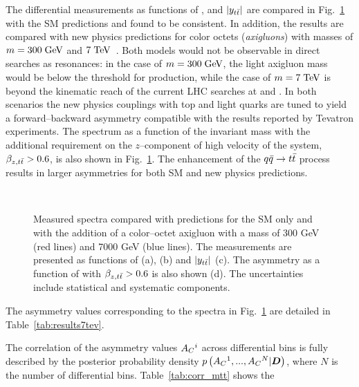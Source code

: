 The differential \ac{} measurements as functions of
\mtt{}, \pttt{} and $|y_{t\bar{t}}{}|$ are compared in Fig.~\ref{fig:unfac_diff}
with the SM predictions and found to be consistent. 
In addition, the results are compared with new physics predictions for
color octets ({\it axigluons}) with masses of $m=300 \; \mathrm{GeV}{}$ and $7
\; \mathrm{TeV}{}$~\cite{AguilarSaavedra:2011ci}. Both models would not
be observable in direct searches as \ttbar{} resonances: in the case
of $m=300\; \mathrm{GeV}$, the light axigluon mass would be below the threshold
for \ttbar{} production, while the case of $m=7 \; \mathrm{TeV}$ is beyond the
kinematic reach of the current LHC searches at \seventev{} and
\eighttev{}. In both scenarios the new physics couplings with top and
light quarks are tuned to yield a forward--backward asymmetry
compatible with the results reported by Tevatron experiments.
The \ac{} spectrum as a function of the \ttbar{} invariant mass \mtt{}
with the additional requirement on the $z$--component of high velocity
of the \ttbar{} system, $\beta_{z,t\bar{t}}{}>0.6$, is also shown in
Fig.~\ref{fig:unfac_diff}. The enhancement of the $q\bar{q}{}\to t\bar{t}{}$
process results in larger asymmetries for both SM and new physics
predictions.
\begin{figure}[!htb]\centering
   \quad
   \\
   \quad
  \caption{Measured \ac{} spectra compared with predictions for the SM
    only and with the addition of a color--octet axigluon with a mass
    of 300 GeV (red lines) and 7000 GeV (blue lines).
    The measurements are presented as functions of \mtt{} (a), \pttt{} (b) and $|y_{t\bar{t}}{}|$ (c). The
    asymmetry as a function of \mtt{} with $\beta_{z,t\bar{t}}{}>0.6$ is also
    shown (d). The uncertainties include statistical and systematic
    components.}
  \label{fig:unfac_diff}
\end{figure}
The asymmetry values corresponding to the spectra in
Fig.~\ref{fig:unfac_diff} are detailed in
Table~\ref{tab:results7tev}.

The correlation of the asymmetry values $A_C{}^i$ across differential
bins is fully described by the posterior probability density
$p\left(A_C{}^1,...,A_C{}^N|\boldsymbol{D}{}\right)$, where $N$ is the
number of differential bins. Table~\ref{tab:corr_mtt} shows the
